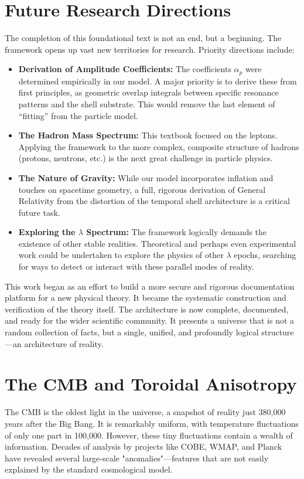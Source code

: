 \documentclass[12pt]{report}
\begin{document}
\section{Future Research Directions}
The completion of this foundational text is not an end, but a beginning. The framework opens up vast new territories for research. Priority directions include:
\begin{itemize}
    \item \textbf{Derivation of Amplitude Coefficients:} The coefficients $\alpha_p$ were determined empirically in our model. A major priority is to derive these from first principles, as geometric overlap integrals between specific resonance patterns and the shell substrate. This would remove the last element of ``fitting'' from the particle model.
    \item \textbf{The Hadron Mass Spectrum:} This textbook focused on the leptons. Applying the framework to the more complex, composite structure of hadrons (protons, neutrons, etc.) is the next great challenge in particle physics.
    \item \textbf{The Nature of Gravity:} While our model incorporates inflation and touches on spacetime geometry, a full, rigorous derivation of General Relativity from the distortion of the temporal shell architecture is a critical future task.
    \item \textbf{Exploring the $\lambda$ Spectrum:} The framework logically demands the existence of other stable realities. Theoretical and perhaps even experimental work could be undertaken to explore the physics of other $\lambda$ epochs, searching for ways to detect or interact with these parallel modes of reality.
\end{itemize}

This work began as an effort to build a more secure and rigorous documentation platform for a new physical theory. It became the systematic construction and verification of the theory itself. The architecture is now complete, documented, and ready for the wider scientific community. It presents a universe that is not a random collection of facts, but a single, unified, and profoundly logical structure---an architecture of reality.

\section{The CMB and Toroidal Anisotropy}
The CMB is the oldest light in the universe, a snapshot of reality just 380,000 years after the Big Bang. It is remarkably uniform, with temperature fluctuations of only one part in 100,000. However, these tiny fluctuations contain a wealth of information. Decades of analysis by projects like COBE, WMAP, and Planck have revealed several large-scale "anomalies"—features that are not easily explained by the standard cosmological model.
\end{document}
